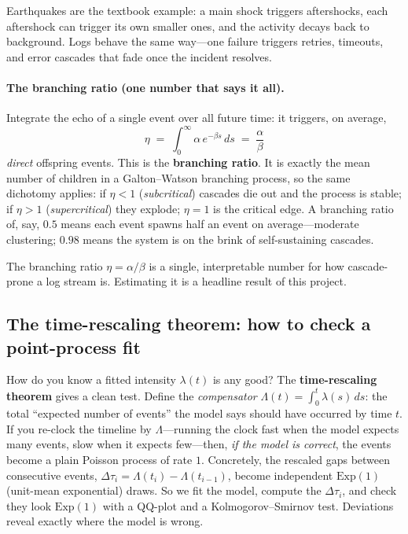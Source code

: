 \documentclass[11pt,a4paper]{article}
\newcommand{\keyword}[1]{\textbf{\color{accent}#1}}
\begin{document}
\begin{intuition}
Earthquakes are the textbook example: a main shock triggers aftershocks, each
aftershock can trigger its own smaller ones, and the activity decays back to
background. Logs behave the same way---one failure triggers retries, timeouts,
and error cascades that fade once the incident resolves.
\end{intuition}

\paragraph{The branching ratio (one number that says it all).} Integrate the
echo of a single event over all future time: it triggers, on average,
\begin{equation}
\eta \;=\; \int_0^\infty \alpha\,e^{-\beta s}\,ds \;=\; \frac{\alpha}{\beta}
\end{equation}
\emph{direct} offspring events. This is the \keyword{branching ratio}. It is
exactly the mean number of children in a Galton--Watson branching process, so the
same dichotomy applies: if $\eta<1$ (\emph{subcritical}) cascades die out and the
process is stable; if $\eta>1$ (\emph{supercritical}) they explode; $\eta=1$ is
the critical edge. A branching ratio of, say, $0.5$ means each event spawns half
an event on average---moderate clustering; $0.98$ means the system is on the
brink of self-sustaining cascades.

\begin{takeaway}
The branching ratio $\eta=\alpha/\beta$ is a single, interpretable number for how
cascade-prone a log stream is. Estimating it is a headline result of this project.
\end{takeaway}

\subsection{The time-rescaling theorem: how to check a point-process fit}
\label{sec:primer-rescaling}
How do you know a fitted intensity $\lambda(t)$ is any good? The
\keyword{time-rescaling theorem} gives a clean test. Define the \emph{compensator}
$\Lambda(t)=\int_0^t\lambda(s)\,ds$: the total ``expected number of events'' the
model says should have occurred by time $t$. If you re-clock the timeline by
$\Lambda$---running the clock fast when the model expects many events, slow when
it expects few---then, \emph{if the model is correct}, the events become a plain
Poisson process of rate $1$. Concretely, the rescaled gaps between consecutive
events, $\Delta\tau_i=\Lambda(t_i)-\Lambda(t_{i-1})$, become independent
$\mathrm{Exp}(1)$ (unit-mean exponential) draws. So we fit the model, compute the
$\Delta\tau_i$, and check they look $\mathrm{Exp}(1)$ with a QQ-plot and a
Kolmogorov--Smirnov test. Deviations reveal exactly where the model is wrong.
\end{document}

